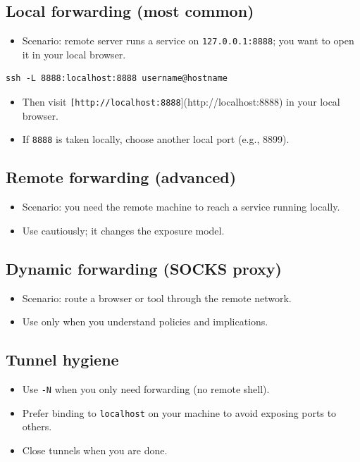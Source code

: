 \subsection{Local forwarding (most common)}
\begin{itemize}
\item Scenario: remote server runs a service on \texttt{127.0.0.1:8888}; you want to open it in your local browser.
\end{itemize}
\begin{verbatim}
ssh -L 8888:localhost:8888 username@hostname
\end{verbatim}
\begin{itemize}
\item Then visit \texttt{[http://localhost:8888}](http://localhost:8888) in your local browser.
\item If \texttt{8888} is taken locally, choose another local port (e.g., 8899).
\end{itemize}

\subsection{Remote forwarding (advanced)}
\begin{itemize}
\item Scenario: you need the remote machine to reach a service running locally.
\item Use cautiously; it changes the exposure model.
\end{itemize}

\subsection{Dynamic forwarding (SOCKS proxy)}
\begin{itemize}
\item Scenario: route a browser or tool through the remote network.
\item Use only when you understand policies and implications.
\end{itemize}

\subsection{Tunnel hygiene}
\begin{itemize}
\item Use \texttt{-N} when you only need forwarding (no remote shell).
\item Prefer binding to \texttt{localhost} on your machine to avoid exposing ports to others.
\item Close tunnels when you are done.
\end{itemize}


